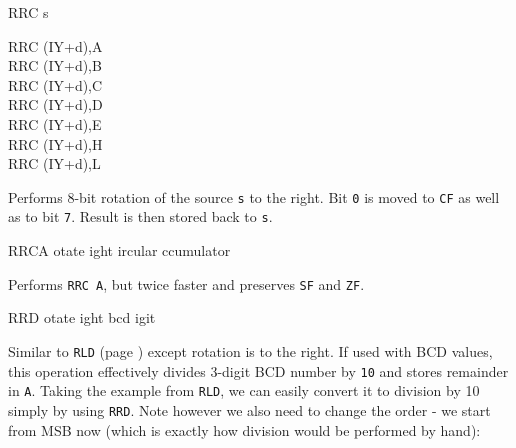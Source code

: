 \begin{basedescript}{
	\desclabelstyle{\multilinelabel}
	\desclabelwidth{3cm}}
\begin{DetailItem}{RRC s}
\begin{DetailVariants}
			\columnbreak
			RRC (IY+d),A\UNDOC\\
			RRC (IY+d),B\UNDOC\\
			RRC (IY+d),C\UNDOC\\
			RRC (IY+d),D\UNDOC\\
			RRC (IY+d),E\UNDOC\\
			RRC (IY+d),H\UNDOC\\
			RRC (IY+d),L\UNDOC
		\end{DetailVariants}

		Performs 8-bit rotation of the source {\tt s} to the right. Bit {\tt 0} is moved to {\tt CF} as well as to bit {\tt 7}. Result is then stored back to {\tt s}.

		\begin{DetailEffects}[p]
			\FlagsRRCr
		\end{DetailEffects}
						
		\begin{DetailTiming}
		\end{DetailTiming}

	\end{DetailItem}

	\begin{DetailItem}{RRCA}
		{otate ight ircular ccumulator}
		{\SymRRC{A}}

		Performs {\tt RRC A}, but twice faster and preserves {\tt SF} and {\tt ZF}.

		\begin{DetailEffects}
			\FlagsRRCA
		\end{DetailEffects}
						
		\begin{DetailTiming}
			\DetailTime{1}{4}
		\end{DetailTiming}

	\end{DetailItem}

	\begin{DetailItem}{RRD}
		{otate ight bcd igit}
		{\SymRRD}
		
		Similar to {\tt RLD} (page \pageref{DetailRefRLD}) except rotation is to the right. If used with BCD values, this operation effectively divides 3-digit BCD number by {\tt 10} and stores remainder in {\tt A}. Taking the example from {\tt RLD}, we can easily convert it to division by 10 simply by using {\tt RRD}. Note however we also need to change the order - we start from MSB now (which is exactly how division would be performed by hand):


\end{DetailItem}
\end{basedescript}
